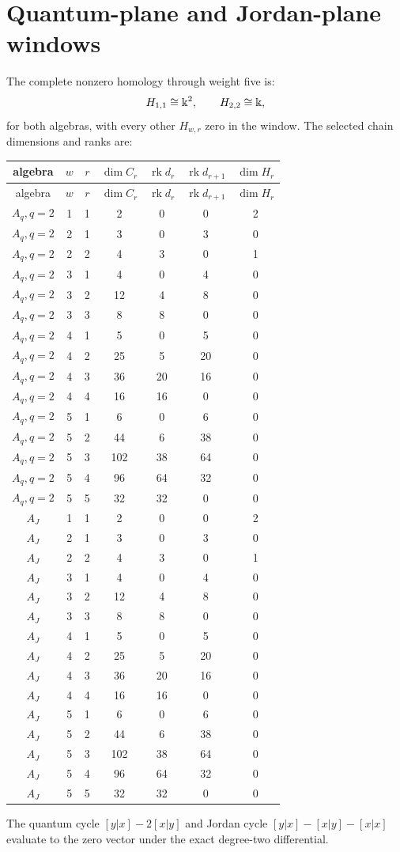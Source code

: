\section{Quantum-plane and Jordan-plane windows}
The complete nonzero homology through weight five is:
\[
 H_{1,1}\cong\Bbbk^2,
 \qquad H_{2,2}\cong\Bbbk,
\]
for both algebras, with every other \(H_{w,r}\) zero in the window.  The selected chain dimensions and ranks are:

\begin{longtable}{c c c c c c c}
\toprule
algebra & \(w\) & \(r\) & \(\dim C_r\) & \(\operatorname{rk}d_r\) & \(\operatorname{rk}d_{r+1}\) & \(\dim H_r\)\\
\midrule
\endfirsthead
\toprule
algebra & \(w\) & \(r\) & \(\dim C_r\) & \(\operatorname{rk}d_r\) & \(\operatorname{rk}d_{r+1}\) & \(\dim H_r\)\\
\midrule
\endhead
\(A_q,q=2\)&1&1&2&0&0&2\\
\(A_q,q=2\)&2&1&3&0&3&0\\
\(A_q,q=2\)&2&2&4&3&0&1\\
\(A_q,q=2\)&3&1&4&0&4&0\\
\(A_q,q=2\)&3&2&12&4&8&0\\
\(A_q,q=2\)&3&3&8&8&0&0\\
\(A_q,q=2\)&4&1&5&0&5&0\\
\(A_q,q=2\)&4&2&25&5&20&0\\
\(A_q,q=2\)&4&3&36&20&16&0\\
\(A_q,q=2\)&4&4&16&16&0&0\\
\(A_q,q=2\)&5&1&6&0&6&0\\
\(A_q,q=2\)&5&2&44&6&38&0\\
\(A_q,q=2\)&5&3&102&38&64&0\\
\(A_q,q=2\)&5&4&96&64&32&0\\
\(A_q,q=2\)&5&5&32&32&0&0\\
\(A_J\)&1&1&2&0&0&2\\
\(A_J\)&2&1&3&0&3&0\\
\(A_J\)&2&2&4&3&0&1\\
\(A_J\)&3&1&4&0&4&0\\
\(A_J\)&3&2&12&4&8&0\\
\(A_J\)&3&3&8&8&0&0\\
\(A_J\)&4&1&5&0&5&0\\
\(A_J\)&4&2&25&5&20&0\\
\(A_J\)&4&3&36&20&16&0\\
\(A_J\)&4&4&16&16&0&0\\
\(A_J\)&5&1&6&0&6&0\\
\(A_J\)&5&2&44&6&38&0\\
\(A_J\)&5&3&102&38&64&0\\
\(A_J\)&5&4&96&64&32&0\\
\(A_J\)&5&5&32&32&0&0\\
\bottomrule
\end{longtable}
The quantum cycle \([y|x]-2[x|y]\) and Jordan cycle \([y|x]-[x|y]-[x|x]\) evaluate to the zero vector under the exact degree-two differential.

